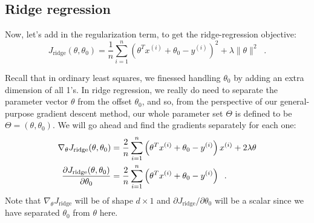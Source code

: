 \subsection{Ridge regression}
Now, let's add in the regularization term, to get the ridge-regression
objective:
$$ J_{\text{ridge}}(\theta, \theta_0) = \frac{1}{n}\sum_{i = 1}^n\left(\theta^Tx^{(i)} + \theta_0 - y^{(i)}\right)^2 + \lambda\|\theta\|^2 \;\;.$$

Recall that in ordinary least squares, we finessed handling $\theta_0$
by adding an extra dimension of all 1's.  In ridge regression,
we really do need to separate the parameter vector $\theta$ from the
offset $\theta_0$, and so, from the perspective of our general-purpose
gradient descent method, our whole parameter set $\Theta$ is defined
to be $\Theta = (\theta, \theta_0)$.  We will go ahead and find the
gradients separately for each one:
\begin{align*}
  \nabla_\theta J_\text{ridge}(\theta, \theta_0)                      & =  \frac{2}{n}\sum_{i=1}^n
  \left(\theta^Tx^{(i)} + \theta_0 -
  y^{(i)}\right) x^{(i)}
  + 2\lambda\theta                                                                                 \\
  \frac{\partial J_\text{ridge}(\theta, \theta_0)}{\partial \theta_0} & =
  \frac{2}{n}\sum_{i=1}^n
  \left(\theta^Tx^{(i)} + \theta_0 -
  y^{(i)} \right) \;\;.
\end{align*}
Note that $\nabla_\theta J_\text{ridge}$ will be of shape $d \times 1$ and
$\partial J_\text{ridge}/\partial \theta_0$ will be a scalar since
we have separated $\theta_0$ from $\theta$ here.



